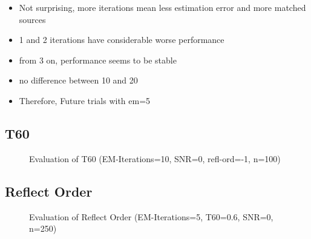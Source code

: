\begin{itemize}
\item Not surprising, more iterations mean less estimation error and more matched sources
\item 1 and 2 iterations have considerable worse performance
\item from 3 on, performance seems to be stable
\item no difference between 10 and 20
\item Therefore, Future trials with em=5
\end{itemize}

\subsection*{T60}
\begin{figure}[H]
    \centering
    \begin{subfigure}{0.49\textwidth}
          \centering
	       
%            
	\end{subfigure}
    \begin{subfigure}{0.49\textwidth}
          \centering
	       
%            
	\end{subfigure}
\caption{Evaluation of T60 (EM-Iterations=10, SNR=0, refl-ord=-1, n=100)}
\end{figure}

\subsection*{Reflect Order}
\begin{figure}[H]
    \centering
    \begin{subfigure}{0.49\textwidth}
          \centering
	       
%            
	\end{subfigure}
    \begin{subfigure}{0.49\textwidth}
          \centering
	       
%            
	\end{subfigure}
\caption{Evaluation of Reflect Order (EM-Iterations=5, T60=0.6, SNR=0, n=250)}
\end{figure}

